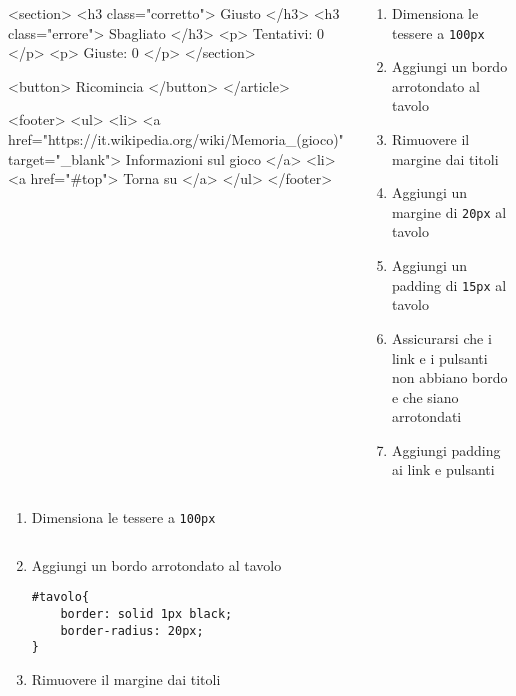 \begin{frame}[fragile]
\begin{exercise}
\begin{columns}
\begin{column}{.45\textwidth}
{<section>
<h3 class="corretto"> Giusto </h3>
<h3 class="errore"> Sbagliato </h3>
      <p> Tentativi: 0 </p>
      <p> Giuste: 0 </p>
  </section>

  <button> Ricomincia </button>
</article>

<footer>
    <ul>
        <li> <a href="https://it.wikipedia.org/wiki/Memoria_(gioco)" target="_blank"> Informazioni sul gioco </a>
        <li> <a href="#top"> Torna su </a>
    </ul>
</footer>}
      \end{column}
      \begin{column}{.45\textwidth}
        \begin{enumerate}
          \item Dimensiona le tessere a \texttt{100px}
          \item Aggiungi un bordo arrotondato al tavolo
          \item Rimuovere il margine dai titoli
          \item Aggiungi un margine di \texttt{20px} al tavolo
          \item Aggiungi un padding di \texttt{15px} al tavolo
          \item Assicurarsi che i link e i pulsanti non abbiano bordo e che siano arrotondati
          \item Aggiungi padding ai link e pulsanti
        \end{enumerate}
      \end{column}
    \end{columns}
  \end{exercise}
\end{frame}

\begin{frame}[fragile]\transfade
  \begin{sol}\centering
    \begin{enumerate}
      \item Dimensiona le tessere a \texttt{100px}
      \makeatletter
      \inputminted[breaklines, firstline=34, lastline=37]{css}{\html@dir/\jobname _\thehtml@count.html}
      \item Aggiungi un bordo arrotondato al tavolo
      \begin{verbatim}
#tavolo{
    border: solid 1px black;
    border-radius: 20px;
}
      \end{verbatim}
      \item Rimuovere il margine dai titoli
      \inputminted[breaklines, firstline=15, lastline=18]{css}{\html@dir/\jobname _\thehtml@count.html}
      \makeatother
    \end{enumerate}
  \end{sol}
\end{frame}

